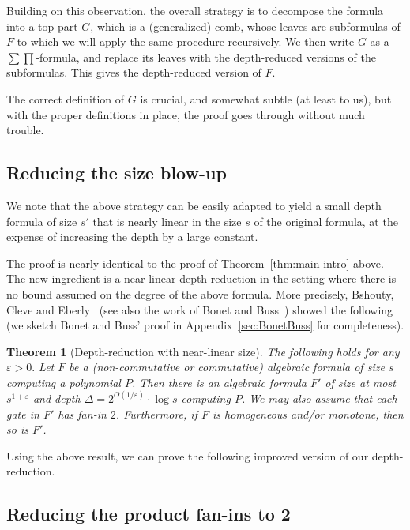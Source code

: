 \documentclass[10pt,a4paper]{article}
\newtheorem{theorem}{Theorem}
\begin{document}
Building on this observation, the overall strategy is to decompose the formula into a top part $G$, which is a (generalized) comb, whose leaves are subformulas of $F$ to which we will apply the same procedure recursively. We then write $G$ as a $\sum\prod$-formula, and replace its leaves with the depth-reduced versions of the subformulas. This gives the depth-reduced version of $F$.

The correct definition of $G$ is crucial, and somewhat subtle (at least to us), but with the proper definitions in place, the proof goes through without much trouble.


\subsection{Reducing the size blow-up}
\label{sec:nearlinear}



We note that the above strategy can be easily adapted to yield a small depth formula of size $s'$ that is nearly linear in the size $s$ of the original formula, at the expense of increasing the depth by a large constant. 

The proof is nearly identical to the proof of Theorem~\ref{thm:main-intro} above. The new ingredient is a near-linear depth-reduction in the setting where there is no bound assumed on the degree of the above formula. More precisely, Bshouty, Cleve and Eberly~\cite{BCE} (see also the work of Bonet and Buss~\cite{BonetBuss}) showed the following (we sketch Bonet and Buss' proof in Appendix~\ref{sec:BonetBuss} for completeness).

\begin{theorem}[Depth-reduction with near-linear size]
	\label{thm:BCE}
	The following holds for any $\varepsilon > 0.$ Let $F$ be a (non-commutative or commutative) algebraic formula of size $s$ computing a polynomial $P$. Then there is an algebraic formula $F'$ of size at most $s^{1+\varepsilon}$ and depth $\Delta = 2^{O(1/\varepsilon)}\cdot \log s$ computing $P$. We may also assume that each gate in $F'$ has fan-in $2$. Furthermore, if $F$ is homogeneous and/or monotone, then so is $F'$.
\end{theorem}

Using the above result, we can prove the following improved version of our depth-reduction.  


\subsection{Reducing the product fan-ins to 2}
\label{sec:fanin2}
\end{document}
